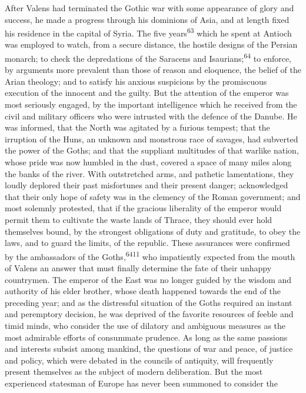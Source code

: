 After Valens had terminated the Gothic war with some appearance
of glory and success, he made a progress through his dominions of
Asia, and at length fixed his residence in the capital of Syria.
The five years\textsuperscript{63} which he spent at Antioch was employed to
watch, from a secure distance, the hostile designs of the Persian
monarch; to check the depredations of the Saracens and Isaurians;\textsuperscript{64}
to enforce, by arguments more prevalent than those of reason
and eloquence, the belief of the Arian theology; and to satisfy
his anxious suspicions by the promiscuous execution of the
innocent and the guilty. But the attention of the emperor was
most seriously engaged, by the important intelligence which he
received from the civil and military officers who were intrusted
with the defence of the Danube. He was informed, that the North
was agitated by a furious tempest; that the irruption of the
Huns, an unknown and monstrous race of savages, had subverted the
power of the Goths; and that the suppliant multitudes of that
warlike nation, whose pride was now humbled in the dust, covered
a space of many miles along the banks of the river. With
outstretched arms, and pathetic lamentations, they loudly
deplored their past misfortunes and their present danger;
acknowledged that their only hope of safety was in the clemency
of the Roman government; and most solemnly protested, that if the
gracious liberality of the emperor would permit them to cultivate
the waste lands of Thrace, they should ever hold themselves
bound, by the strongest obligations of duty and gratitude, to
obey the laws, and to guard the limits, of the republic. These
assurances were confirmed by the ambassadors of the Goths,\textsuperscript{6411}
who impatiently expected from the mouth of Valens an answer that
must finally determine the fate of their unhappy countrymen. The
emperor of the East was no longer guided by the wisdom and
authority of his elder brother, whose death happened towards the
end of the preceding year; and as the distressful situation of
the Goths required an instant and peremptory decision, he was
deprived of the favorite resources of feeble and timid minds, who
consider the use of dilatory and ambiguous measures as the most
admirable efforts of consummate prudence. As long as the same
passions and interests subsist among mankind, the questions of
war and peace, of justice and policy, which were debated in the
councils of antiquity, will frequently present themselves as the
subject of modern deliberation. But the most experienced
statesman of Europe has never been summoned to consider the

